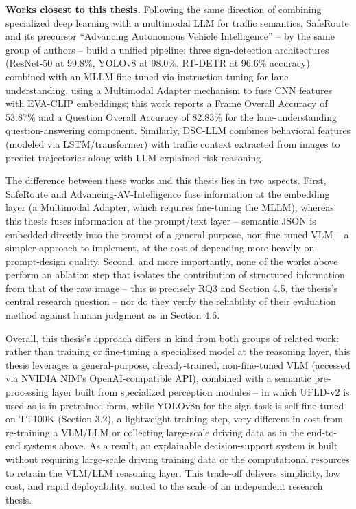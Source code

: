 \documentclass[12pt,a4paper]{report}
\begin{document}
\textbf{Works closest to this thesis.} Following the same direction of combining specialized deep learning with a multimodal LLM for traffic semantics, SafeRoute \cite{shaw2025saferoute} and its precursor ``Advancing Autonomous Vehicle Intelligence'' \cite{sah2025advancing} -- by the same group of authors -- build a unified pipeline: three sign-detection architectures (ResNet-50 at 99.8\%, YOLOv8 at 98.0\%, RT-DETR at 96.6\% accuracy) combined with an MLLM fine-tuned via instruction-tuning for lane understanding, using a Multimodal Adapter mechanism to fuse CNN features with EVA-CLIP embeddings; this work reports a Frame Overall Accuracy of 53.87\% and a Question Overall Accuracy of 82.83\% for the lane-understanding question-answering component. Similarly, DSC-LLM \cite{kim2025dscllm} combines behavioral features (modeled via LSTM/transformer) with traffic context extracted from images to predict trajectories along with LLM-explained risk reasoning.

The difference between these works and this thesis lies in two aspects. First, SafeRoute and Advancing-AV-Intelligence fuse information at the embedding layer (a Multimodal Adapter, which requires fine-tuning the MLLM), whereas this thesis fuses information at the prompt/text layer -- semantic JSON is embedded directly into the prompt of a general-purpose, non-fine-tuned VLM -- a simpler approach to implement, at the cost of depending more heavily on prompt-design quality. Second, and more importantly, none of the works above perform an ablation step that isolates the contribution of structured information from that of the raw image -- this is precisely RQ3 and Section 4.5, the thesis's central research question -- nor do they verify the reliability of their evaluation method against human judgment as in Section 4.6.

Overall, this thesis's approach differs in kind from both groups of related work: rather than training or fine-tuning a specialized model at the reasoning layer, this thesis leverages a general-purpose, already-trained, non-fine-tuned VLM (accessed via NVIDIA NIM's OpenAI-compatible API), combined with a semantic pre-processing layer built from specialized perception modules -- in which UFLD-v2 is used as-is in pretrained form, while YOLOv8n for the sign task is self fine-tuned on TT100K (Section 3.2), a lightweight training step, very different in cost from re-training a VLM/LLM or collecting large-scale driving data as in the end-to-end systems above. As a result, an explainable decision-support system is built without requiring large-scale driving training data or the computational resources to retrain the VLM/LLM reasoning layer. This trade-off delivers simplicity, low cost, and rapid deployability, suited to the scale of an independent research thesis.
\end{document}

